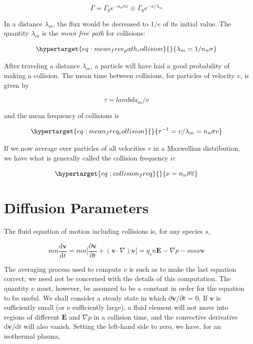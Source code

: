 \documentclass[
  notoc %
]{tufte-book}
\begin{document}
\[
\Gamma = \Gamma_0 e^{-n_n\sigma x} \equiv \Gamma_0 e^{-x/\lambda_m}
\]

In a distance \(\lambda_m\), the flux would be decreased to \(1/e\) of
its initial value. The quantity \(\lambda_m\) is the \emph{mean free
path} for collisions:

\begin{equation}\protect\hypertarget{eq:mean_free_path_collision}{}{
\lambda_m = 1/n_n\sigma
}\label{eq:mean_free_path_collision}\end{equation}

After traveling a distance \(\lambda_m\), a particle will have had a
good probability of making a collision. The mean time between
collisions, for particles of velocity \(v\), is given by

\[
\tau = lambda_m/v
\]

and the mean frequency of collisions is

\begin{equation}\protect\hypertarget{eq:mean_freq_collision}{}{
\tau^{-1} = v/\lambda_m = n_n \sigma v
}\label{eq:mean_freq_collision}\end{equation}

If we now average over particles of all velocities \(v\) in a Maxwellian
distribution, we have what is generally called the collision frequency
\(\nu\):

\begin{equation}\protect\hypertarget{eq:collision_freq}{}{
\nu = n_n \overline{\sigma v}
}\label{eq:collision_freq}\end{equation}

\hypertarget{diffusion-parameters}{%
\section{Diffusion Parameters}\label{diffusion-parameters}}

The fluid equation of motion including collisions is, for any species
\(s\),

\[
mn\frac{\mathrm{d}\mathbf{v}}{\mathrm{d}t} = mn \Big[ \frac{\partial\mathbf{v}}{\partial t} + (\mathbf{v}\cdot\nabla)\mathbf{v} \Big] = q_sn\mathbf{E} - \nabla p - mn\nu\mathbf{v}
\]

The averaging process used to compute \(\nu\) is such as to make the
last equation correct; we need not be concerned with the details of this
computation. The quantity \(\nu\) must, however, be assumed to be a
constant in order for the equation to be useful. We shall consider a
steady state in which \(\partial\mathbf{v}/\partial t\) = 0. If
\(\mathbf{v}\) is sufficiently small (or \(\nu\) sufficiently large), a
fluid element will not move into regions of different \(\mathbf{E}\) and
\(\nabla p\) in a collision time, and the convective derivative
\(\mathrm{d}\mathbf{v}/\mathrm{d}t\) will also vanish. Setting the
left-hand side to zero, we have, for an isothermal plasma,
\end{document}
